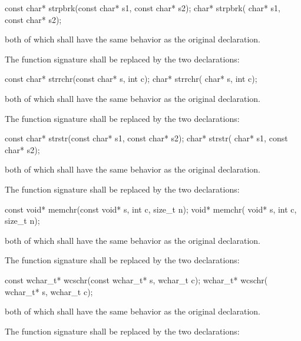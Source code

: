 \begin{codeblock}
const char* strpbrk(const char* s1, const char* s2);
      char* strpbrk(      char* s1, const char* s2);
\end{codeblock}

both of which shall have the same behavior as the original declaration.

\pnum
{}%
The function signature
shall be replaced by the two declarations:

\begin{codeblock}
const char* strrchr(const char* s, int c);
      char* strrchr(      char* s, int c);
\end{codeblock}

both of which shall have the same behavior as the original declaration.

\pnum
{}%
The function signature
shall be replaced by the two declarations:

\begin{codeblock}
const char* strstr(const char* s1, const char* s2);
      char* strstr(      char* s1, const char* s2);
\end{codeblock}

both of which shall have the same behavior as the original declaration.

\pnum
{}%
The function signature
shall be replaced by the two declarations:

\begin{codeblock}
const void* memchr(const void* s, int c, size_t n);
      void* memchr(      void* s, int c, size_t n);
\end{codeblock}

both of which shall have the same behavior as the original declaration.

\pnum
{}%
The function signature
shall be replaced by the two declarations:

\begin{codeblock}
const wchar_t* wcschr(const wchar_t* s, wchar_t c);
      wchar_t* wcschr(      wchar_t* s, wchar_t c);
\end{codeblock}

both of which shall have the same behavior as the original declaration.

\pnum
{}%
The function signature
shall be replaced by the two declarations:

